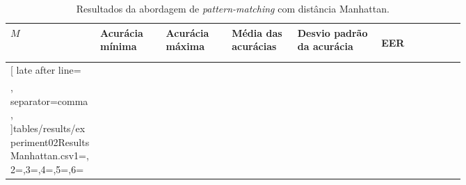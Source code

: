 \begin{table}[H]
	\newcommand{\mc}[3]{\multicolumn{#1}{#2}{#3}}
	\begin{center}
		\begin{tabular}{|p{0.15\linewidth}|p{0.11\linewidth}|p{0.11\linewidth}|p{0.11\linewidth}|p{0.14\linewidth}|p{0.14\linewidth}|}\hline
			\rowcolor{tcA}
			\centering\textbf{$M$} & \centering\textbf{Acurácia mínima} & \centering\textbf{Acurácia máxima} & \centering\textbf{Média das acurácias} & \centering\textbf{Desvio padrão da acurácia} & \begin{center}\textbf{EER}\end{center}\\\hline
			
			\rowcolor{tcB}
			\csvreader[
			late after line=\\\hline\rowcolor{tcB},%
			separator=comma,
			]{tables/results/experiment02ResultsManhattan.csv}{1=\eme,2=\minAccu,3=\maxAccu,4=\meanAccu,5=\stdDev,6=\eer}{\centering\eme\% & \centering\StrSubstitute[0]{\minAccu}{.}{,} & \centering\StrSubstitute[0]{\maxAccu}{.}{,} & \centering\StrSubstitute[0]{\meanAccu}{.}{,} & \centering\StrSubstitute[0]{\stdDev}{.}{,} & \StrSubstitute[0]{\eer}{.}{,}}
		\end{tabular}
	\end{center}
	\caption{Resultados da abordagem de \textit{pattern-matching} com distância Manhattan.}
	\label{tab:experiment02ResultsManhattan}
\end{table}